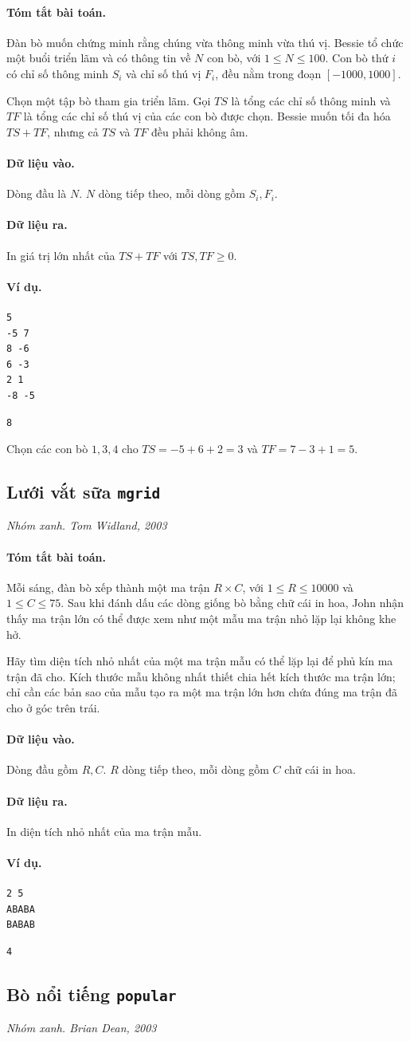 \documentclass[11pt]{article}
\newcommand{\problem}[4]{%
  \subsection[#1 (#2)]{#1 \hfill {\normalsize\texttt{#2}}}%
  \noindent\textit{#3. #4}\par\smallskip
}
\newcommand{\iosec}[1]{\paragraph{#1}}
\begin{document}
\iosec{Tóm tắt bài toán.}
Đàn bò muốn chứng minh rằng chúng vừa thông minh vừa thú vị. Bessie tổ chức
một buổi triển lãm và có thông tin về \(N\) con bò, với \(1\le N\le 100\).
Con bò thứ \(i\) có chỉ số thông minh \(S_i\) và chỉ số thú vị \(F_i\), đều
nằm trong đoạn \([-1000,1000]\).

Chọn một tập bò tham gia triển lãm. Gọi \(TS\) là tổng các chỉ số thông minh
và \(TF\) là tổng các chỉ số thú vị của các con bò được chọn. Bessie muốn tối
đa hóa \(TS+TF\), nhưng cả \(TS\) và \(TF\) đều phải không âm.

\iosec{Dữ liệu vào.}
Dòng đầu là \(N\). \(N\) dòng tiếp theo, mỗi dòng gồm \(S_i,F_i\).

\iosec{Dữ liệu ra.}
In giá trị lớn nhất của \(TS+TF\) với \(TS,TF\ge 0\).

\iosec{Ví dụ.}
\begin{verbatim}
5
-5 7
8 -6
6 -3
2 1
-8 -5
\end{verbatim}

\begin{verbatim}
8
\end{verbatim}

Chọn các con bò \(1,3,4\) cho \(TS=-5+6+2=3\) và \(TF=7-3+1=5\).

\problem{Lưới vắt sữa}{mgrid}{Nhóm xanh}{Tom Widland, 2003}

\iosec{Tóm tắt bài toán.}
Mỗi sáng, đàn bò xếp thành một ma trận \(R\times C\), với
\(1\le R\le 10000\) và \(1\le C\le 75\). Sau khi đánh dấu các dòng giống bò
bằng chữ cái in hoa, John nhận thấy ma trận lớn có thể được xem như một mẫu
ma trận nhỏ lặp lại không khe hở.

Hãy tìm diện tích nhỏ nhất của một ma trận mẫu có thể lặp lại để phủ kín ma
trận đã cho. Kích thước mẫu không nhất thiết chia hết kích thước ma trận lớn;
chỉ cần các bản sao của mẫu tạo ra một ma trận lớn hơn chứa đúng ma trận đã
cho ở góc trên trái.

\iosec{Dữ liệu vào.}
Dòng đầu gồm \(R,C\). \(R\) dòng tiếp theo, mỗi dòng gồm \(C\) chữ cái in hoa.

\iosec{Dữ liệu ra.}
In diện tích nhỏ nhất của ma trận mẫu.

\iosec{Ví dụ.}
\begin{verbatim}
2 5
ABABA
BABAB
\end{verbatim}

\begin{verbatim}
4
\end{verbatim}

\problem{Bò nổi tiếng}{popular}{Nhóm xanh}{Brian Dean, 2003}
\end{document}
